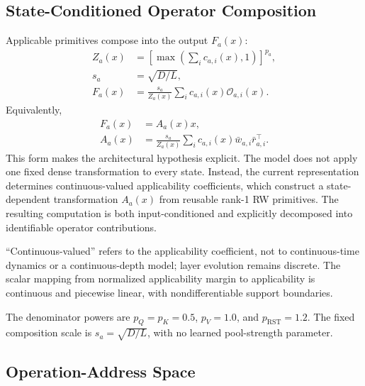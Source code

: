 \documentclass{article}
\newcommand{\op}{\mathcal{O}}
\begin{document}
\subsection{State-Conditioned Operator Composition}
\label{sec:operator-composition}

Applicable primitives compose into the output \(F_a(x)\):
\begin{align}
Z_a(x)&=\left[\max\!\left(\sum_i c_{a,i}(x),1\right)\right]^{p_a},\\
s_a&=\sqrt{D/L},\nonumber\\
F_a(x)&=\frac{s_a}{Z_a(x)}
\sum_i c_{a,i}(x)\op_{a,i}(x).
\label{eq:implemented_composition}
\end{align}
Equivalently,
\begin{equation}
\begin{aligned}
F_a(x)&=A_a(x)x,\\
A_a(x)&=\frac{s_a}{Z_a(x)}
\sum_i c_{a,i}(x)\bar w_{a,i}\bar r_{a,i}^{\top}.
\end{aligned}
\label{eq:state_dependent_operator}
\end{equation}
This form makes the architectural hypothesis explicit. The model does not apply
one fixed dense transformation to every state. Instead, the current
representation determines continuous-valued applicability coefficients, which
construct a state-dependent transformation \(A_a(x)\) from reusable rank-1 RW
primitives. The resulting computation is both input-conditioned and explicitly
decomposed into identifiable operator contributions.

``Continuous-valued'' refers to the applicability coefficient, not to
continuous-time dynamics or a continuous-depth model; layer evolution remains
discrete. The scalar mapping from normalized applicability margin to
applicability is continuous and piecewise linear, with nondifferentiable support
boundaries.

The denominator powers are \(p_Q=p_K=0.5\), \(p_V=1.0\), and
\(p_{\mathrm{RST}}=1.2\). The fixed composition scale is
\(s_a=\sqrt{D/L}\), with no
learned pool-strength parameter.

\subsection{Operation-Address Space}
\label{sec:operation-space}
\end{document}
